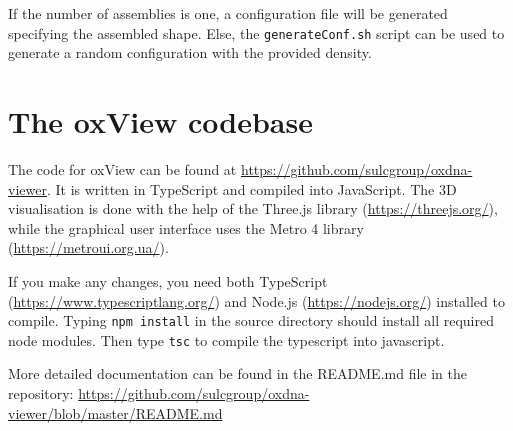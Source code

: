 If the number of assemblies is one, a configuration file will be generated specifying the assembled shape. Else, the \texttt{generateConf.sh} script can be used to generate a random configuration with the provided density.


\chapter{The oxView codebase}

The code for oxView can be found at \url{https://github.com/sulcgroup/oxdna-viewer}. It is written in TypeScript and compiled into JavaScript. The 3D visualisation is done with the help of the Three.js library (\url{https://threejs.org/}), while the graphical user interface uses the Metro 4 library (\url{https://metroui.org.ua/}). 

If you make any changes, you need both TypeScript (\url{https://www.typescriptlang.org/}) and Node.js (\url{https://nodejs.org/}) installed to compile. Typing \verb|npm install| in the source directory should install all required node modules. Then type \verb|tsc| to compile the typescript into javascript. 

More detailed documentation can be found in the README.md file in the repository: \url{https://github.com/sulcgroup/oxdna-viewer/blob/master/README.md}

\minitoc

